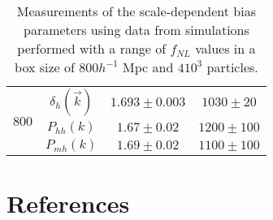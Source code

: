 \documentclass[10pt,letterpaper,final]{iopart}
\numberwithin{equation}{subsection}
\begin{document}
\begin{table}[!htb]
\begin{center}
\begin{tabular}{ | c | c | c | c |}
	\multirow{3}{*}{800} &$\delta_h(\vec{k})$ & $1.693 \pm 0.003$ & $1030 \pm 20$\\ \cline{2-4}
	&$P_{hh}(k)$ & $1.67 \pm 0.02$ & $1200 \pm 100$ \\ \cline{2-4}
	&$P_{mh}(k)$ & $1.69 \pm 0.02$ & $1100 \pm 100$\\ \hline \hline
	
	\end{tabular}			
\end{center}
\caption{Measurements of the scale-dependent bias parameters using data from simulations performed with a range of $f_{NL}$ values in a box size of $800 h^{-1}$ Mpc and $410^3$ particles.}
\label{tab:scalebias}
\end{table}




\newpage


\section*{References}





\pagebreak
\end{document}
